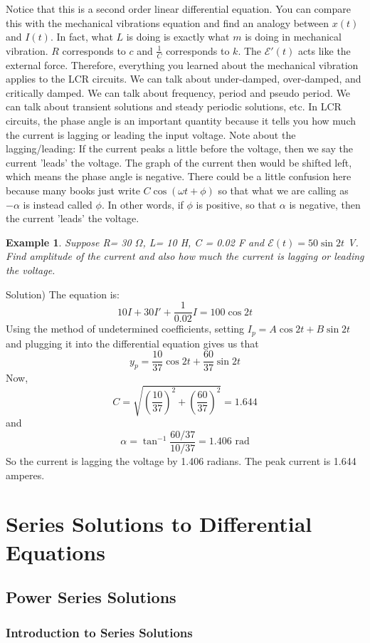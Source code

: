 \documentclass[12pt]{report}
\newtheorem{ex}{Example}[section]
\begin{document}
Notice that this is a second order linear differential equation. You can compare this with the mechanical vibrations equation and find an analogy between $x(t)$ and $I(t)$. In fact, what $L$ is doing is exactly what $m$ is doing in mechanical vibration. $R$ corresponds to $c$ and $\frac{1}{C}$ corresponds to $k$. The $ \mathcal{E}' (t)$ acts like the external force. Therefore, everything you learned about the mechanical vibration applies to the LCR circuits. We can talk about under-damped, over-damped, and critically damped. We can talk about frequency, period and pseudo period. We can talk about transient solutions and steady periodic solutions, etc. In LCR circuits, the phase angle is an important quantity because it tells you how much the current is lagging or leading the input voltage.
Note about the lagging/leading: If the current peaks a little before the voltage, then we say the current 'leads' the voltage. The graph of the current then would be shifted left, which means the phase angle is negative. There could be a little confusion here because many books just write $C \cos(\omega t + \phi)$ so that what we are calling as $-\alpha$ is instead called $\phi$. In other words, if $\phi$ is positive, so that $\alpha$ is negative, then the current 'leads' the voltage.

\begin{ex}
Suppose R= 30 $\Omega$, L= 10 H, C = 0.02 F and $ \mathcal{E} (t) = 50 \sin 2t$ V. Find amplitude of the current and also how much the current is lagging or leading the voltage.
\end{ex}
Solution)
The equation is:
$$ 10 I + 30 I' + \frac{1}{0.02}I= 100 \cos 2t$$
Using the method of undetermined coefficients, setting $I_p= A \cos 2t + B \sin 2t$ and plugging it into the differential equation gives us that
$$y_p =\frac{10}{37}\cos 2t + \frac{60}{37}\sin 2t$$
Now,
$$C = \sqrt{ \left(\frac{10}{37}\right)^2+\left(\frac{60}{37}\right)^2 } = 1.644$$
and
$$\alpha = \tan^{-1} \frac{60/37}{10/37} = 1.406 \textrm{ rad}$$
So the current is lagging the voltage by 1.406 radians. The peak current is 1.644 amperes.

\chapter{Series Solutions to Differential Equations}
\section{Power Series Solutions}
\subsection*{Introduction to Series Solutions}
\end{document}
